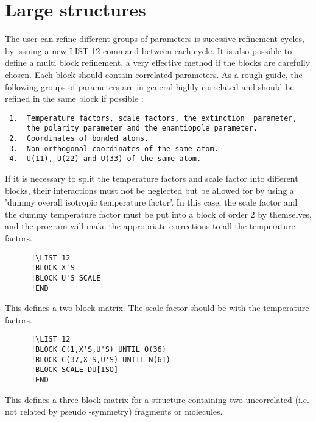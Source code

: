 \documentclass[10pt,a4paper]{report}
\begin{document}
\section{Large structures}


The user can refine different groups of parameters is  sucessive refinement
 cycles, by issuing a new LIST 12 command between each cycle. It is also
 possible to define a multi block refinement, a very effective method if the
 blocks are carefully chosen. Each block should contain correlated parameters.
 As a rough guide, the following groups of parameters are in general
 highly correlated and should be refined in the same block if possible :

\small\begin{verbatim}
 1.  Temperature factors, scale factors, the extinction  parameter,
     the polarity parameter and the enantiopole parameter.
 2.  Coordinates of bonded atoms.
 3.  Non-orthogonal coordinates of the same atom.
 4.  U(11), U(22) and U(33) of the same atom.
\end{verbatim}\normalsize




If it is necessary to split the temperature factors and scale
 factor into different blocks, their interactions must not be neglected
 but be allowed for by using a 'dummy overall isotropic temperature
 factor'.
 In this case, the scale factor and the dummy temperature factor
 must be put into a block of order 2 by themselves, and the program
 will make the appropriate corrections to all the temperature factors.


\small\begin{verbatim}
      !\LIST 12
      !BLOCK X'S
      !BLOCK U'S SCALE
      !END
\end{verbatim}\normalsize




This defines a two block matrix. The scale factor should be with the
 temperature factors.


\small\begin{verbatim}
      !\LIST 12
      !BLOCK C(1,X'S,U'S) UNTIL O(36)
      !BLOCK C(37,X'S,U'S) UNTIL N(61)
      !BLOCK SCALE DU[ISO]
      !END
\end{verbatim}\normalsize




This defines a three block matrix for a structure containing two
 uncorrelated (i.e. not related by pseudo -symmetry) fragments or molecules.
\end{document}
